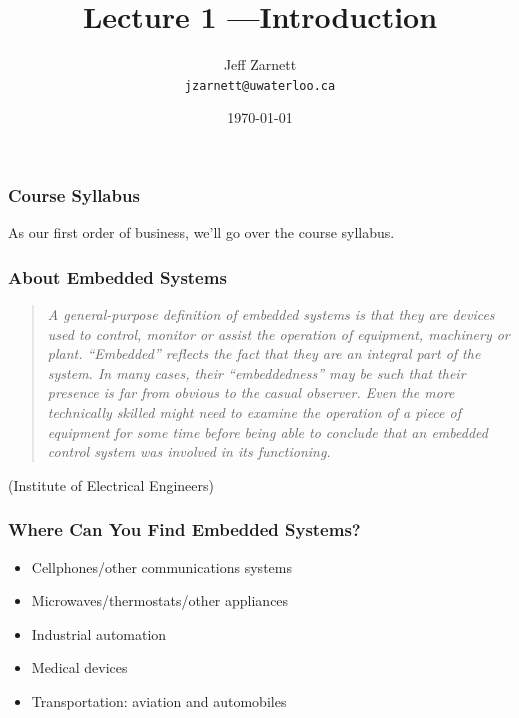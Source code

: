 

\title{Lecture 1 ---Introduction}

\author[Lam]{Jeff Zarnett \\ \small \texttt{jzarnett@uwaterloo.ca}}
\date{\today}




\begin{frame}
  \titlepage

 \end{frame}

\begin{frame}
\frametitle{Course Syllabus}
As our first order of business, we'll go over the course syllabus.
\end{frame}

\begin{frame}
\frametitle{About Embedded Systems}

\begin{quote}
    \emph{A general-purpose definition of embedded systems is that they
      are devices used to control, monitor or assist the operation of
      equipment, machinery or plant. ``Embedded'' reflects the fact that
      they are an integral part of the system. In many cases, their
      ``embeddedness'' may be such that their presence is far from
      obvious to the casual observer. Even the more technically skilled
      might need to examine the operation of a piece of equipment for
      some time before being able to conclude that an embedded control
      system was involved in its functioning.}
\end{quote}
\hfill(Institute of Electrical Engineers)

\end{frame}

\begin{frame}
\frametitle{Where Can You Find Embedded Systems?}
\begin{itemize}
	\item Cellphones/other communications systems
	\item Microwaves/thermostats/other appliances
	\item Industrial automation
	\item Medical devices
	\item Transportation: aviation and automobiles
\end{itemize}
\end{frame}



